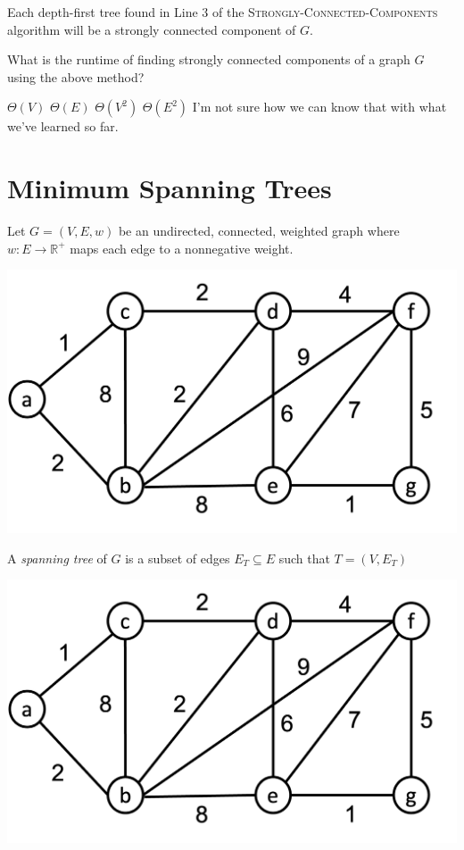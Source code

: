 \documentclass[11  pt]{exam}
\begin{document}
	\begin{theorem}
		Each depth-first tree found in Line 3 of the \textsc{Strongly-Connected-Components} algorithm will be a strongly connected component of $G$.
	\end{theorem}

\newpage
\phantom{.}

\newpage
\begin{Qu}
	What is the runtime of finding strongly connected components of a graph $G$ using the above method?
	\begin{itemize}
		\aitem $\Theta(V)$
		\bitem $\Theta(E)$
		\citem $\Theta(V^2)$
		\ditem $\Theta(E^2)$
		\eitem I'm not sure how we can know that with what we've learned so far.
	\end{itemize}
\end{Qu}
\newpage

	\section{Minimum Spanning Trees}
Let $G = (V,E,w)$ be an undirected, connected, weighted graph where $w \colon E \rightarrow \mathbb{R}^+$ maps each edge to a nonnegative weight.


\begin{center}
	\includegraphics[width = .5\linewidth]{mst-graph.png}
\end{center}

A \emph{spanning tree} of $G$ is a subset of edges $E_T \subseteq E$ such that $T = (V,E_T)$  

\begin{center}
	\includegraphics[width = .5\linewidth]{mst-graph.png}
\end{center}
\end{document}
